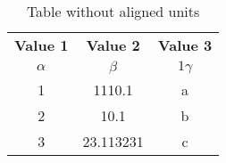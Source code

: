 \documentclass{article}
\begin{document}
	
	\begin{table}[h!]
		\begin{center}
			\caption{Table without aligned units}
			\label{tab:table1}
			\begin{tabular}{c|c|c}
				\textbf{Value 1} & \textbf{Value 2} &
				\textbf{Value 3}\\
				$\alpha$ & $\beta$ & $1\gamma$\\
				\hline
				1 & 1110.1 & a\\
				2 & 10.1 & b\\
				3 & 23.113231 & c\\
				\end{tabular}
			\end{center}
		\end{table}
	
\end{document}
